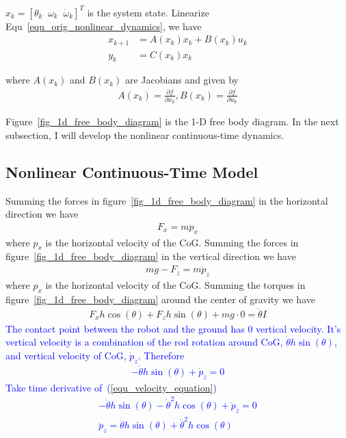 \documentclass[12pt]{article}
\begin{document}
$x_k=[\theta_k\;\;\omega_k\;\;\dot{\omega}_k]^T$ is the system state. 
Linearize Equ~\ref{equ_orig_nonlinear_dynamics}, we have
\begin{align}
x_{k+1} & = A(x_k)x_k + B(x_k)u_k \\
y_k & = C(x_k)x_k
\end{align}

where $A(x_k)$ and $B(x_k)$ are Jacobians and given by
\begin{align}
A(x_k) = \frac{\partial f}{\partial x_k},
B(x_k) = \frac{\partial f}{\partial u_k}
\end{align}

Figure~\ref{fig_1d_free_body_diagram} is the 1-D free body diagram.
In the next subsection, I will develop the nonlinear continuous-time
dynamics.

\subsection{Nonlinear Continuous-Time Model}
Summing the forces in figure~\ref{fig_1d_free_body_diagram} in the horizontal
direction we have
\begin{align}
F_x=m\ddot{p}_x
\end{align}
where $p_x$ is the horizontal velocity of the CoG.
Summing the forces in figure~\ref{fig_1d_free_body_diagram} in the vertical
direction we have
\begin{align}
mg-F_z = m\ddot{p}_z
\label{equ_vertical_newton}
\end{align}
where $p_x$ is the horizontal velocity of the CoG.
Summing the torques in figure~\ref{fig_1d_free_body_diagram} around the
center of gravity we have
\begin{align}
F_x h\cos(\theta) + F_z h\sin(\theta) + mg\cdot 0= \ddot{\theta}I
\label{equ_rotation_newton}
\end{align}
\textcolor{blue}{
The contact point between the robot and the ground has $0$ vertical velocity.
It's vertical velocity is a combination of the rod rotation around 
CoG, $\dot{\theta}h\sin(\theta)$,
and vertical velocity of CoG, $\dot{p}_z$. Therefore
\begin{align}
-\dot{\theta}h\sin(\theta) + \dot{p}_z = 0
\label{equ_velocity_equation}
\end{align}
Take time derivative of~(\ref{equ_velocity_equation})
\begin{align}
-\ddot{\theta}h\sin(\theta) - \dot{\theta}^2h\cos(\theta) + \ddot{p}_z = 0\\
\ddot{p}_z = \ddot{\theta}h\sin(\theta) + \dot{\theta}^2h\cos(\theta)
\label{equ_ddot_p_z}
\end{align}}
\end{document}
